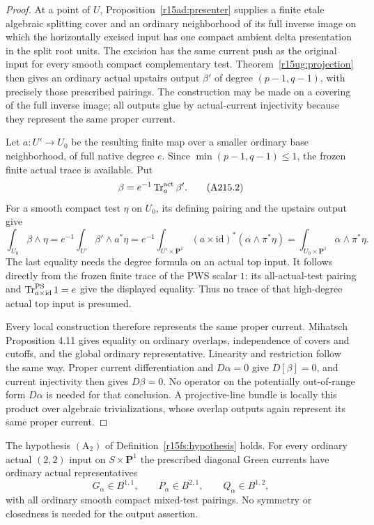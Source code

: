\begin{proof}
At a point of $U$, Proposition~\ref{r15ad:presenter} supplies
a finite etale algebraic splitting cover and an ordinary neighborhood
of its full inverse image on which the horizontally excised input
has one compact ambient delta presentation in the split root units.
The excision has the same current push as the original input for
every smooth compact complementary test.
Theorem~\ref{r15ug:projection} then gives an ordinary actual
upstairs output $\beta'$ of degree $(p-1,q-1)$, with precisely
those prescribed pairings. The construction may be made on a
covering of the full inverse image; all outputs glue by actual-current
injectivity because they represent the same proper current.

Let $a:U'\to U_0$ be the resulting finite map over a smaller
ordinary base neighborhood, of full native degree $e$. Since
$\min(p-1,q-1)\leq1$, the frozen finite actual trace is available.
Put
\[
                 \beta=e^{-1}\operatorname{Tr}^{\rm act}_a\beta'.
\tag{A215.2}\label{r15a2:trace}
\]
For a smooth compact test $\eta$ on $U_0$, its defining pairing
and the upstairs output give
\[
 \int_{U_0}\beta\wedge\eta
  =e^{-1}\int_{U'}\beta'\wedge a^*\eta
  =e^{-1}\int_{U'\times\mathbf P^1}
                     (a\times\mathrm{id})^*(\alpha\wedge\pi^*\eta)
  =\int_{U_0\times\mathbf P^1}\alpha\wedge\pi^*\eta.
\tag{A215.3}\label{r15a2:native-pairing}
\]
The last equality needs the degree formula on an actual top input.
It follows directly from the frozen finite trace of the PWS scalar
$1$: its all-actual-test pairing and
$\operatorname{Tr}^{\rm PS}_{a\times\mathrm{id}}1=e$
give the displayed equality. Thus no trace of that high-degree
actual top input is presumed.

Every local construction therefore represents the same proper
current. Mihatsch Proposition 4.11 gives equality on ordinary
overlaps, independence of covers and cutoffs, and the global
ordinary representative. Linearity and restriction follow the
same way. Proper current differentiation and $D\alpha=0$ give
$D[\beta]=0$, and current injectivity then gives $D\beta=0$.
No operator on the potentially out-of-range form $D\alpha$ is
needed for that conclusion. A projective-line bundle is locally
this product over algebraic trivializations, whose overlap
outputs again represent its same proper current.
\end{proof}

\begin{corollary}
\label{r15a2:activation}
The hypothesis $(\mathrm A_2)$ of Definition~\ref{r15fs:hypothesis}
holds. For every ordinary actual $(2,2)$ input on
$S\times\mathbf P^1$ the prescribed diagonal Green currents
have ordinary actual representatives
\[
       G_\alpha\in B^{1,1},\qquad
       P_\alpha\in B^{2,1},\qquad
       Q_\alpha\in B^{1,2},
\tag{A215.4}\label{r15a2:green}
\]
with all ordinary smooth compact mixed-test pairings.
No symmetry or closedness is needed for the output assertion.
\end{corollary}


